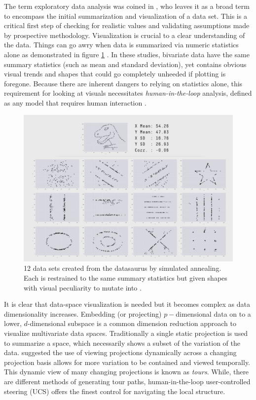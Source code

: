 \documentclass{monashthesis}
\begin{document}
The term exploratory data analysis was coined in
\textcite{tukey_exploratory_1977}, who leaves it as a broad term to
encompass the initial summarization and visualization of a data set.
This is a critical first step of checking for realistic values and
validating assumptions made by prospective methodology. Visualization is
crucial to a clear understanding of the data. Things can go awry when
data is summarized via numeric statistics alone
\autocite{anscombe_graphs_1973} as demonstrated in figure
\ref{fig:matejka17fig} \autocite{matejka_same_2017}. In these studies,
bivariate data have the same summary statistics (such as mean and
standard deviation), yet contains obvious visual trends and shapes that
could go completely unheeded if plotting is foregone. Because there are
inherent dangers to relying on statistics alone, this requirement for
looking at visuals necessitates \emph{human-in-the-loop} analysis,
defined as any model that requires human interaction
\autocite{karwowski_international_2006}.






\begin{figure}

{\centering \includegraphics[width=0.7\linewidth]{./figures/matejka17fig} 

}

\caption{12 data sets created from the datasaurus by
simulated annealing. Each is restrained to the same summary statistics
but given shapes with visual peculiarity to mutate into
\autocite{matejka_same_2017}.}\label{fig:matejka17fig}
\end{figure}

It is clear that data-space visualization is needed but it becomes
complex as data dimensionality increases. Embedding (or projecting)
\(p-\)dimensional data on to a lower, \(d\)-dimensional subspace is a
common dimension reduction approach to visualize multivariate data
spaces. Traditionally a single static projection is used to summarize a
space, which necessarily shows a subset of the variation of the data.
\textcite{asimov_grand_1985} suggested the use of viewing projections
dynamically across a changing projection basis allows for more variation
to be contained and viewed temporally. This dynamic view of many
changing projections is known as \emph{tours}. While, there are
different methods of generating tour paths, human-in-the-loop
user-controlled steering (UCS) offers the finest control for navigating
the local structure.
\end{document}
